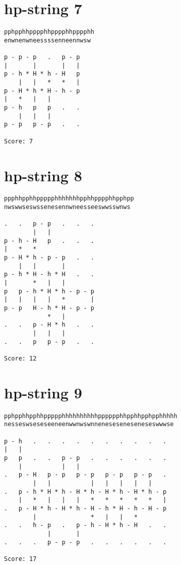 \documentclass[a4paper,oneside,article,11pt]{memoir}
\begin{document}
\pagebreak

\section*{hp-string 7}
\begin{lstlisting}[basicstyle=\ttfamily]
pphpphhpppphhpppphhpppphh
enwnenwneessssenneennwsw

p - p - p   .   p - p  
|       |       |   |  
p - h * H * h - H   p  
    |   |   *   *   |  
p - H * h * H - h - p  
|   *   |   |          
p - h   p   p   .   .  
    |   |   |          
p - p   p - p   .   .  
                       
Score: 7
\end{lstlisting}

\section*{hp-string 8}
\begin{lstlisting}[basicstyle=\ttfamily]
ppphhpphhppppphhhhhhhpphhpppphhpphpp
nwswwseswssenesennwneesseeswwsswnws

.   .   p - p   .   .   .  
        |   |              
p - h - H   p   .   .   .  
|   *   *                  
p - H * h - p - p   .   .  
    |   |       |          
p - h * H - h * H   .   .  
|       *   |   |          
p   p - h * H * h - p - p  
|   |   |   |   *       |  
p - p   H - h * H - p - p  
            *   |          
.   .   p - H * h   .   .  
        |   |   |          
.   .   p   p - p   .   .  
                           
Score: 12
\end{lstlisting}

\pagebreak

\section*{hp-string 9}
\begin{lstlisting}[basicstyle=\ttfamily]
pphpphhpphhppppphhhhhhhhhhpppppphhpphhpphpphhhhh
nesseswseseseeneenwwnwswnneneseseneseneseswwwse

p - h   .   .   .   .   .   .   .   .   .   .  
|   |                                          
p   p   .   .   p - p   .   .   .   .   .   .  
    |           |   |                          
.   p - H   p - p   p - p   p - p   p - p   .  
        |   |           |   |   |   |   |      
.   p - h * H * h - H * h - H * h - H * h - p  
    |   *   |   |   |   *   *   *   *   *   |  
.   p - H * h - H * h - H - h * H - h - H - p  
        |               *   |   |   *          
.   .   h - p   .   p - h - H * h - H   .   .  
            |       |                          
.   .   .   p - p - p   .   .   .   .   .   .  
                                               
Score: 17
\end{lstlisting}
\end{document}

